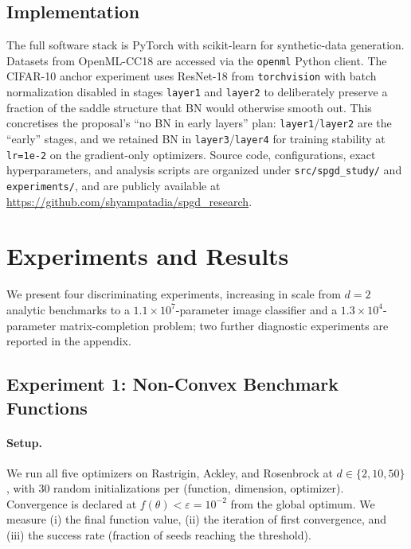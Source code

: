 \documentclass[11pt]{article}
\begin{document}
\subsection{Implementation}
The full software stack is PyTorch \citep{paszke2019pytorch} with
scikit-learn \citep{pedregosa2011sklearn} for synthetic-data
generation. Datasets from OpenML-CC18
\citep{vanschoren2014openml,bischl2021openmlcc18} are accessed via the
\texttt{openml} Python client. The CIFAR-10 anchor experiment uses
ResNet-18 \citep{he2016resnet} from \texttt{torchvision} with batch
normalization \citep{ioffe2015batchnorm} disabled in stages
\texttt{layer1} and \texttt{layer2} to deliberately preserve a
fraction of the saddle structure that BN would otherwise smooth out.
This concretises the proposal's ``no BN in early layers'' plan:
\texttt{layer1}/\texttt{layer2} are the ``early'' stages, and we
retained BN in \texttt{layer3}/\texttt{layer4} for training stability
at \texttt{lr=1e-2} on the gradient-only optimizers.
Source code, configurations, exact hyper\-parameters, and analysis
scripts are organized under \texttt{src/spgd\_study/} and
\texttt{experiments/}, and are publicly available at
\url{https://github.com/shyampatadia/spgd_research}.

\section{Experiments and Results}
\label{sec:results}

We present four discriminating experiments, increasing in scale from
$d=2$ analytic benchmarks to a $1.1\times 10^{7}$-parameter image
classifier and a $1.3\times 10^{4}$-parameter matrix-completion
problem; two further diagnostic experiments are reported in the
appendix.

\subsection{Experiment 1: Non-Convex Benchmark Functions}
\label{sec:exp1}

\paragraph{Setup.} We run all five optimizers on Rastrigin, Ackley,
and Rosenbrock at $d \in \{2, 10, 50\}$, with 30 random initializations
per (function, dimension, optimizer). Convergence is declared at
$f(\theta) < \varepsilon = 10^{-2}$ from the global optimum. We
measure (i) the final function value, (ii) the iteration of first
convergence, and (iii) the success rate (fraction of seeds reaching
the threshold).
\end{document}
